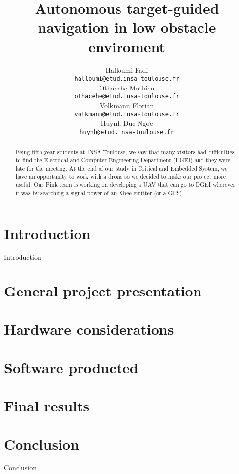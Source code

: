 \documentclass[10pt,a4paper,titlepage]{report}
\author{Halloumi Fadi\\\texttt{halloumi@etud.insa-toulouse.fr}\\
Othacehe Mathieu\\\texttt{othacehe@etud.insa-toulouse.fr}\\
Volkmann Florian\\\texttt{volkmann@etud.insa-toulouse.fr}\\
Huynh Duc Ngoc\\\texttt{huynh@etud.insa-toulouse.fr}}
\title{Autonomous target-guided navigation in low obstacle enviroment}
\begin{document}
\maketitle %
\begin{abstract} %
Being fifth year students at INSA Toulouse, we saw that many visitors had difficulties to find the Electrical and Computer Engineering Department (DGEI) and they were late for the meeting. At the end of our study in Critical and Embedded System, we have an opportunity to work with a drone so we decided to make our project more useful. Our Pink team is working on developing a UAV that can go to DGEI wherever it was by searching a signal power of an Xbee emitter (or a GPS).
\end{abstract}

\tableofcontents %
\clearpage


\chapter{Introduction}
Introduction

\chapter{General project presentation}

\chapter{Hardware considerations}

\chapter{Software producted}

\chapter{Final results}


\chapter{Conclusion}
Conclusion
\end{document}
